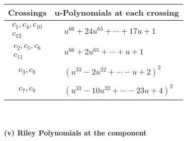 \documentclass[1p]{elsarticle_modified}
\theoremstyle{definition}
\begin{document}
\begin{tabular}{m{50pt}|m{274pt}}
Crossings & \hspace{64pt}u-Polynomials at each crossing \\
\hline $$\begin{aligned}c_{1},c_{4},c_{10}\\c_{12}\end{aligned}$$&$\begin{aligned}
&u^{66}+24 u^{65}+\cdots+17 u+1
\end{aligned}$\\
\hline $$\begin{aligned}c_{2},c_{5},c_{6}\\c_{11}\end{aligned}$$&$\begin{aligned}
&u^{66}+2 u^{65}+\cdots+u+1
\end{aligned}$\\
\hline $$\begin{aligned}c_{3},c_{8}\end{aligned}$$&$\begin{aligned}
&(u^{33}-2 u^{32}+\cdots- u+2)^{2}
\end{aligned}$\\
\hline $$\begin{aligned}c_{7},c_{9}\end{aligned}$$&$\begin{aligned}
&(u^{33}-10 u^{32}+\cdots-23 u+4)^{2}
\end{aligned}$\\
\hline
\end{tabular}\\~\\
\newpage\renewcommand{\arraystretch}{1}
\flushleft \textbf{(v) Riley Polynomials at the component}\newline \\
\end{document}
